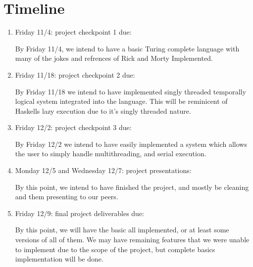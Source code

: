 \documentclass[numbers]{sigplanconf}
\begin{document}
\section{Timeline}
\begin{enumerate}
\item    Friday 11/4: project checkpoint 1 due:

  By Friday 11/4, we intend to have a basic Turing complete language
  with many of the jokes and refrences of Rick and Morty Implemented.

\item  Friday 11/18: project checkpoint 2 due:

By Friday 11/18 we intend to have implemented singly threaded
temporally logical system integrated into the language. This will be 
reminicent of Haskells lazy execution due to it's singly threaded nature.

\item  Friday 12/2: project checkpoint 3 due:
  
  By Friday 12/2 we intend to have easily implemented a system which
  allows the user to simply handle multithreading, and serial execution.

\item  Monday 12/5 and Wednesday 12/7: project presentations:

By this point, we intend to have finished the project, and mostly be
cleaning and them presenting to our peers.

\item Friday 12/9: final project deliverables due:

By this point, we will have the basic all implemented, or at least
some versions of all of them. We may have remaining features that we
were unable to implement due to the scope of the project, but complete
basics implementation will be done.
\end{enumerate}

\nocite{*}




{}
\end{document}
